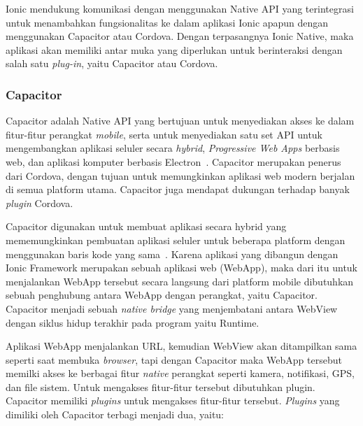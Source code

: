 \newpage

Ionic mendukung komunikasi dengan menggunakan Native API yang terintegrasi untuk menambahkan fungsionalitas ke dalam aplikasi Ionic apapun dengan menggunakan Capacitor atau Cordova. Dengan terpasangnya Ionic Native, maka aplikasi akan memiliki antar muka yang diperlukan untuk berinteraksi dengan salah satu {\it plug-in}, yaitu Capacitor atau Cordova.

\subsubsection{Capacitor}
\label{subsec:capacitor}
Capacitor adalah Native API yang bertujuan untuk menyediakan akses ke dalam fitur-fitur perangkat \textit{mobile}, serta untuk menyediakan satu set API untuk mengembangkan aplikasi seluler secara \textit{hybrid}, {\it Progressive Web Apps} berbasis web, dan aplikasi komputer berbasis Electron~\cite{tor:19:software}. Capacitor merupakan penerus dari Cordova, dengan tujuan untuk memungkinkan aplikasi web modern berjalan di semua platform utama. Capacitor juga mendapat dukungan terhadap banyak {\it plugin} Cordova.

Capacitor digunakan untuk membuat aplikasi secara hybrid yang mememungkinkan pembuatan aplikasi seluler untuk beberapa platform dengan menggunakan baris kode yang sama~\cite{huber:21:pwa}. Karena aplikasi yang dibangun dengan Ionic Framework merupakan sebuah aplikasi web (WebApp), maka dari itu untuk menjalankan WebApp tersebut secara langsung dari platform mobile dibutuhkan sebuah penghubung antara WebApp dengan perangkat, yaitu Capacitor. Capacitor menjadi sebuah \textit{native bridge} yang menjembatani antara WebView dengan siklus hidup terakhir pada program yaitu Runtime.

Aplikasi WebApp menjalankan URL, kemudian WebView akan ditampilkan sama seperti saat membuka \textit{browser}, tapi dengan Capacitor maka WebApp tersebut memilki akses ke berbagai fitur \textit{native} perangkat seperti kamera, notifikasi, GPS, dan file sistem. Untuk mengakses fitur-fitur tersebut dibutuhkan plugin. Capacitor memiliki \textit{plugins} untuk mengakses fitur-fitur tersebut. \textit{Plugins} yang dimiliki oleh Capacitor terbagi menjadi dua, yaitu:

